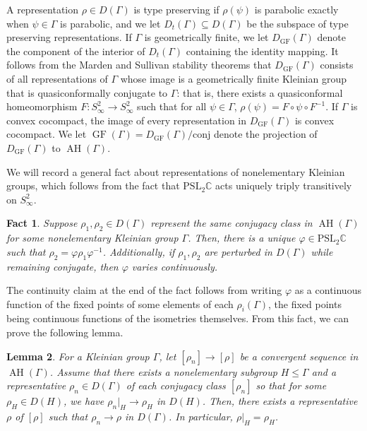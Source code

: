 \documentclass[11pt,leqno]{article}
\DeclareMathOperator{\AH}{AH}
\DeclareMathOperator{\GF}{GF}
\newtheorem{lemma}{Lemma}
\newtheorem{fact}[lemma]{Fact}
\theoremstyle{introdef}
\numberwithin{lemma}{section}
\theoremstyle{definition}
\newcommand{\C}{\mathbb{C}}
\begin{document}
A representation $\rho\in D(\Gamma)$ is type preserving if $\rho(\psi)$ is parabolic exactly when $\psi\in\Gamma$ is parabolic, and we let $D_t(\Gamma)\subseteq D(\Gamma)$ be the subspace of type preserving representations. If $\Gamma$ is geometrically finite, we let $D_{\GF}(\Gamma)$ denote the component of the interior of $D_t(\Gamma)$ containing the identity mapping. It follows from the Marden \cite{MAR} and Sullivan stability theorems \cite{SUL} that $D_{\GF}(\Gamma)$ consists of all representations of $\Gamma$ whose image is a geometrically finite Kleinian group that is quasiconformally conjugate to $\Gamma$: that is, there exists a quasiconformal homeomorphism $F:S^2_\infty\rightarrow S^2_\infty$ such that for all $\psi\in\Gamma$, $\rho(\psi)=F\circ\psi\circ F^{-1}$. If $\Gamma$ is convex cocompact, the image of every representation in $D_{\GF}(\Gamma)$ is convex cocompact. We let $\GF(\Gamma)=D_{\GF}(\Gamma)/\text{conj}$ denote the projection of $D_{\GF}(\Gamma)$ to $\AH(\Gamma)$. \par

We will record a general fact about representations of nonelementary Kleinian groups, which follows from the fact that $\mathrm{PSL}_2\C$ acts uniquely triply transitively on $S^2_\infty$.

\begin{fact}
    \label{Fact-UniqueConjugator}
    Suppose $\rho_1,\rho_2\in D(\Gamma)$ represent the same conjugacy class in $\AH(\Gamma)$ for some nonelementary Kleinian group $\Gamma$. Then, there is a unique $\varphi\in\mathrm{PSL}_2\C$ such that $\rho_2=\varphi\rho_1\varphi^{-1}$. Additionally, if $\rho_1,\rho_2$ are perturbed in $D(\Gamma)$ while remaining conjugate, then $\varphi$ varies continuously.
\end{fact}

The continuity claim at the end of the fact follows from writing $\varphi$ as a continuous function of the fixed points of some elements of each $\rho_i(\Gamma)$, the fixed points being continuous functions of the isometries themselves. From this fact, we can prove the following lemma.


\begin{lemma}
\label{Lemma-AHNonelemSubgroupConvg}
    For a Kleinian group $\Gamma$, let $[\rho_n]\rightarrow[\rho]$ be a convergent sequence in $\AH(\Gamma)$. Assume that there exists a nonelementary subgroup $H\leq\Gamma$ and a representative $\rho_n\in D(\Gamma)$ of each conjugacy class $[\rho_n]$ so that for some $\rho_H\in D(H)$, we have $\rho_n|_H\rightarrow\rho_H$ in $D(H)$. Then, there exists a representative $\rho$ of $[\rho]$ such that $\rho_n\rightarrow\rho$ in $D(\Gamma)$. In particular, $\rho|_H=\rho_H$.
\end{lemma}
\end{document}
